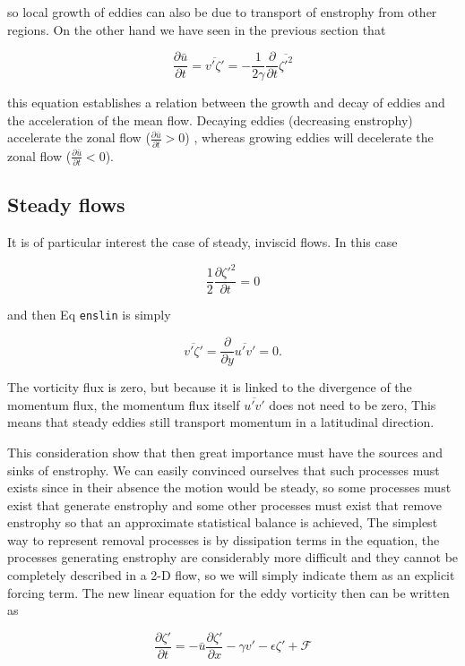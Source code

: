 so local growth of eddies can also be due to transport of enstrophy from
other regions. On the other hand we have seen in the previous section
that

{\[\frac{\partial \bar{u}}{\partial t} =\overline{v'\zeta'}=-\frac{1}{2\gamma}\frac{\partial }{\partial t}  \overline{\zeta'^2}\]}

this equation establishes a relation between the growth and decay of
eddies and the acceleration of the mean flow. Decaying eddies
(decreasing enstrophy) accelerate the zonal flow
(\(\frac{\partial \bar{u}}{\partial t}>0\)) , whereas growing eddies
will decelerate the zonal flow
(\(\frac{\partial \bar{u}}{\partial t}< 0\)).

\subsection{Steady flows}\label{steady-flows}

It is of particular interest the case of steady, inviscid flows. In this
case

\[\frac{1}{2}\frac{\partial \zeta'^2}{\partial t} = 0\]

and then Eq \texttt{enslin} is simply

\[\overline{v'\zeta'} = \frac{\partial }{\partial y}\overline{u'v'} = 0.\]

The vorticity flux is zero, but because it is linked to the divergence
of the momentum flux, the momentum flux itself \(\overline{u'v'}\) does
not need to be zero, This means that steady eddies still transport
momentum in a latitudinal direction.

This consideration show that then great importance must have the sources
and sinks of enstrophy. We can easily convinced ourselves that such
processes must exists since in their absence the motion would be steady,
so some processes must exist that generate enstrophy and some other
processes must exist that remove enstrophy so that an approximate
statistical balance is achieved, The simplest way to represent removal
processes is by dissipation terms in the equation, the processes
generating enstrophy are considerably more difficult and they cannot be
completely described in a 2-D flow, so we will simply indicate them as
an explicit forcing term. The new linear equation for the eddy vorticity
then can be written as

{\[\frac{\partial \zeta'}{\partial t} = -\bar{u}\frac{\partial \zeta'}{\partial x} -\gamma v'-\epsilon\zeta'+ \mathcal{F}\]}

